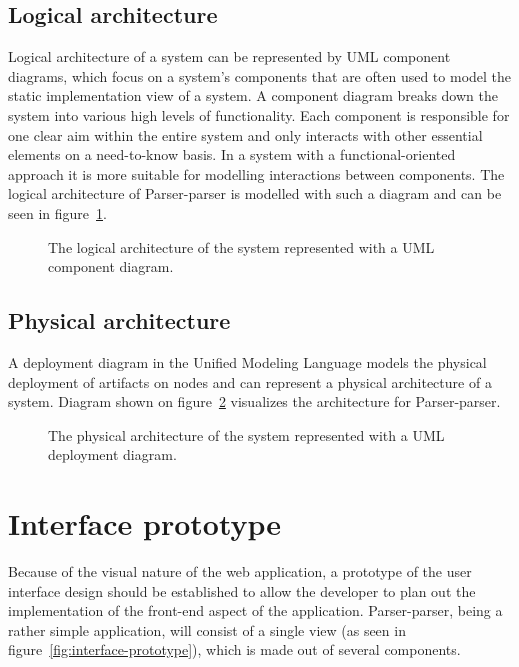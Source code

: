\documentclass[english,engineering]{wizthesis}
\newcommand{\paraphrase}[1]{#1}
\newcommand{\thisproject}{Parser-parser}
\begin{document}
\subsection{Logical architecture}

Logical architecture of a system can be represented by UML component diagrams,
which focus on a system's components that are often used to model the static
implementation view of a system. \paraphrase{A component diagram breaks down the
system into various high levels of functionality. Each component is responsible
for one clear aim within the entire system and only interacts with other
essential elements on a need-to-know basis.} In a system with a
functional-oriented approach it is more suitable for modelling interactions
between components. The logical architecture of \thisproject{} is modelled with
such a diagram and can be seen in figure~\ref{fig:logical-architecture}.

\begin{figure}[H]
  \centering
  \resizebox{0.8\textwidth}{!}{\small}
  \caption{The logical architecture of the system represented with a UML
  component diagram.}
  \label{fig:logical-architecture}
\end{figure}

\subsection{Physical architecture}

A deployment diagram in the Unified Modeling Language models the physical
deployment of artifacts on nodes and can represent a physical architecture of
a system. Diagram shown on figure~\ref{fig:physical-architecture} visualizes
the architecture for \thisproject{}.

\begin{figure}[H]
  \centering
  \resizebox{\textwidth}{!}{\footnotesize}
  \caption{The physical architecture of the system represented with a UML
  deployment diagram.}
  \label{fig:physical-architecture}
\end{figure}

\section{Interface prototype} \label{sec:interface-prototype}

Because of the visual nature of the web application, a prototype of the user
interface design should be established to allow the developer to plan out the
implementation of the front-end aspect of the application. \thisproject{}, being
a rather simple application, will consist of a single view (as seen in
figure~\ref{fig:interface-prototype}), which is made out of several components.
\end{document}
